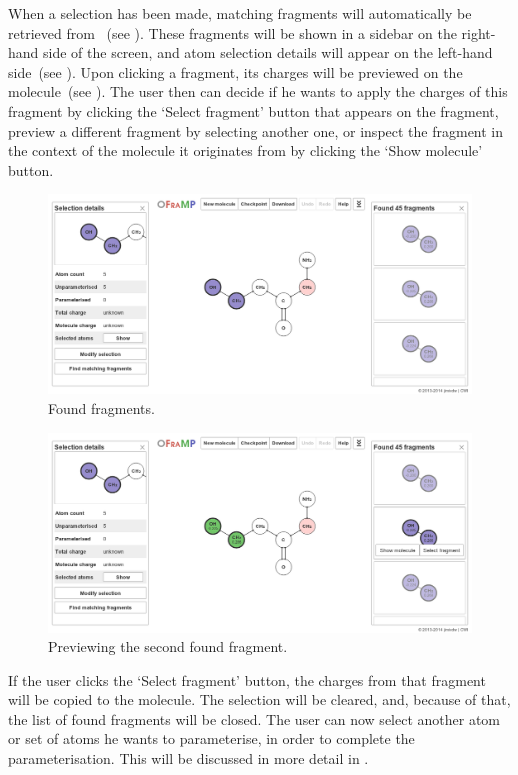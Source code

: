 When a selection has been made, matching fragments will automatically be retrieved from \omfraf~(see ). These fragments will be shown in a sidebar on the right-hand side of the screen, and atom selection details will appear on the left-hand side~(see ). Upon clicking a fragment, its charges will be previewed on the molecule~(see ). The user then can decide if he wants to apply the charges of this fragment by clicking the `Select fragment' button that appears on the fragment, preview a different fragment by selecting another one, or inspect the fragment in the context of the molecule it originates from by clicking the `Show molecule' button.

\begin{figure}
\begin{center}
\includegraphics[width=.9\textwidth]{img/find_1.png}
\caption{Found fragments.}
\end{center}
\end{figure}

\begin{figure}
\begin{center}
\includegraphics[width=.9\textwidth]{img/find_2.png}
\caption{Previewing the second found fragment.}
\end{center}
\end{figure}

If the user clicks the `Select fragment' button, the charges from that fragment will be copied to the molecule. The selection will be cleared, and, because of that, the list of found fragments will be closed. The user can now select another atom or set of atoms he wants to parameterise, in order to complete the parameterisation. This will be discussed in more detail in .


